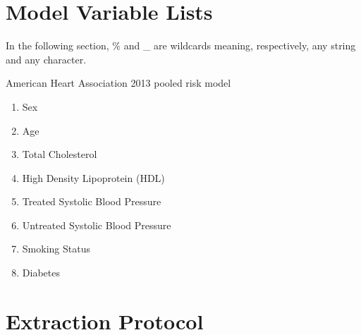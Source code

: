 \documentclass[a4paper,12pt]{article}
\begin{document}
   	\newpage
   	\begin{appendices}
   		
   		\section{Model Variable Lists}
   		In the following section, \% and \_ are wildcards meaning, respectively, any string and any character.
   		
		American Heart Association 2013 pooled risk model
		\begin{enumerate}
			\item Sex
			\item Age
			\item Total Cholesterol
			\item High Density Lipoprotein (HDL)
			\item Treated Systolic Blood Pressure
			\item Untreated Systolic Blood Pressure
			\item Smoking Status
			\item Diabetes
		\end{enumerate}
   		\newpage
   		
   		\section{Extraction Protocol}

\end{appendices}
\end{document}
